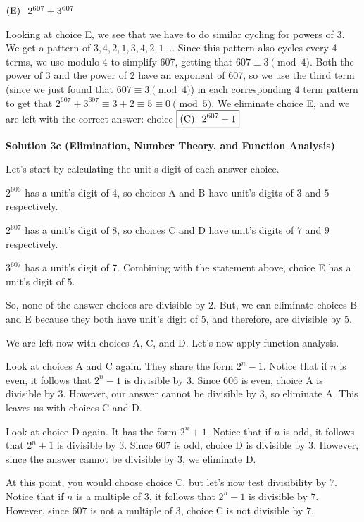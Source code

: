 \begin{enumerate}
 
$(\text{E}) \hspace{0.1in} 2^{607} + 3^{607}$ 

 


 
Looking at choice E, we see that we have to do similar cycling for powers of $3$. We get a pattern of $3,4,2,1,3,4,2,1 \dots$. Since this pattern also cycles every 4 terms, we use modulo 4 to simplify 607, getting that $607 \equiv 3\pmod{4}$. Both the power of 3 and the power of 2 have an exponent of 607, so we use the third term (since we just found that $607 \equiv 3\pmod{4}$) in each corresponding 4 term pattern to get that $2^{607} + 3^{607} \equiv 3+2 \equiv 5 \equiv 0\pmod{5}$. We eliminate choice E, and we are left with the correct answer: choice $\boxed{(\text{C}) \hspace{0.1in} 2^{607}-1}$




\textbf{Solution 3c (Elimination, Number Theory, and Function Analysis)}

Let’s start by calculating the unit’s digit of each answer choice.

 $2^{606}$ has a unit’s digit of 4, so choices A and B have unit’s digits of $3$ and $5$ respectively.

 $2^{607}$ has a unit’s digit of 8, so choices C and D have unit’s digits of $7$ and $9$ respectively.

 $3^{607}$ has a unit’s digit of 7. Combining with the statement above, choice E has a unit’s digit of $5$.

 So, none of the answer choices are divisible by $2$. But, we can eliminate choices B and E because they both have unit’s digit of $5$, and therefore, are divisible by $5$.

 We are left now with choices A, C, and D. Let’s now apply function analysis.

 Look at choices A and C again. They share the form $2^{n}-1$. Notice that if $n$ is even, it follows that $2^{n}-1$ is divisible by $3$. Since $606$ is even, choice A is divisible by $3$. However, our answer cannot be divisible by $3$, so eliminate A. This leaves us with choices C and D.

 Look at choice D again. It has the form $2^{n}+1$. Notice that if $n$ is odd, it follows that $2^{n}+1$ is divisible by 3. Since $607$ is odd, choice D is divisible by $3$. However, since the answer cannot be divisible by $3$, we eliminate D.

 At this point, you would choose choice C, but let’s now test divisibility by $7$. Notice that if $n$ is a multiple of 3, it follows that $2^{n}-1$ is divisible by $7$. However, since $607$ is not a multiple of $3$, choice C is not divisible by $7$.


\end{enumerate}
